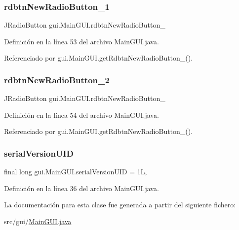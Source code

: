 \subsubsection{\texorpdfstring{rdbtnNewRadioButton\_1}{rdbtnNewRadioButton\_1}}
{\footnotesize\ttfamily J\+Radio\+Button gui.\+Main\+G\+U\+I.\+rdbtn\+New\+Radio\+Button\+\_\hspace{0.3cm}{\ttfamily [private]}}



Definición en la línea 53 del archivo Main\+G\+U\+I.\+java.



Referenciado por gui.\+Main\+G\+U\+I.\+get\+Rdbtn\+New\+Radio\+Button\+\_().

\mbox{\label{classgui_1_1_main_g_u_i_ad3dcb9314fa6097b181df71e981de64e}} 
\subsubsection{\texorpdfstring{rdbtnNewRadioButton\_2}{rdbtnNewRadioButton\_2}}
{\footnotesize\ttfamily J\+Radio\+Button gui.\+Main\+G\+U\+I.\+rdbtn\+New\+Radio\+Button\+\_\hspace{0.3cm}{\ttfamily [private]}}



Definición en la línea 54 del archivo Main\+G\+U\+I.\+java.



Referenciado por gui.\+Main\+G\+U\+I.\+get\+Rdbtn\+New\+Radio\+Button\+\_().

\mbox{\label{classgui_1_1_main_g_u_i_a75dfef8d845a0c8de7a6476c7f7d35e1}} 
\subsubsection{\texorpdfstring{serialVersionUID}{serialVersionUID}}
{\footnotesize\ttfamily final long gui.\+Main\+G\+U\+I.\+serial\+Version\+U\+ID = 1L\hspace{0.3cm}{\ttfamily [static]}, {\ttfamily [private]}}



Definición en la línea 36 del archivo Main\+G\+U\+I.\+java.



La documentación para esta clase fue generada a partir del siguiente fichero\+:\begin{DoxyCompactItemize}
\item 
src/gui/\mbox{\hyperlink{_main_g_u_i_8java}{Main\+G\+U\+I.\+java}}\end{DoxyCompactItemize}
